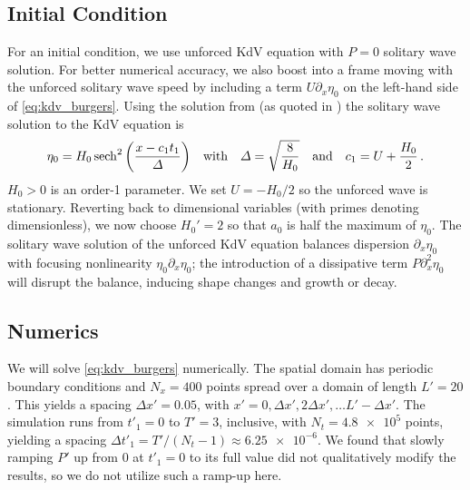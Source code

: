 \documentclass{jfm}
\begin{document}
\subsection{Initial Condition}
For an initial condition, we use unforced KdV equation with $P=0$
solitary wave solution.
For better numerical accuracy, we also boost into a frame moving with
the unforced solitary wave speed by including a term $U\partial_x
\eta_0$ on the left-hand side of \cref{eq:kdv_burgers}.
Using the solution from \citet{dingemans1997water} (as quoted in
\citealp{brun2018convective}) the solitary wave solution to the KdV
equation is
\begin{equation}
  \eta_0 = H_0 \sech^2\pqty{\frac{x - c_1 t_1}{\Delta}}
  \qq{with}
  \Delta = \sqrt{\frac{8}{H_0}}
  \qq{and}
  c_1 = U + \frac{H_0}{2} \,.
\end{equation}
$H_0>0$ is an order-1 parameter.
We set $U=-H_0/2$ so the unforced wave is stationary.
Reverting back to dimensional variables (with primes denoting
dimensionless), we now choose $H_0'=2$ so that $a_0$ is half the maximum
of $\eta_0$.
The solitary wave solution of the unforced KdV equation balances
dispersion $\partial_x \eta_0$ with focusing nonlinearity $\eta_0
\partial_x \eta_0$; the introduction of a dissipative term $P
\partial_x^2 \eta_0$ will disrupt the balance, inducing shape changes
and growth or decay.

\subsection{Numerics}
We will solve \cref{eq:kdv_burgers} numerically.
The spatial domain has periodic boundary conditions and $N_x = 400$
points spread over a domain of length $L' = 20$.
This yields a spacing $\Delta x' = 0.05$, with $x' = 0, \Delta x',
2\Delta x', \ldots L' - \Delta x'$.
The simulation runs from $t'_1 = 0$ to $T' = 3$, inclusive, with
$N_t = \num{4.8e5}$ points, yielding a spacing $\Delta t'_1 = T'/(N_t-1)
\approx \num{6.25e-6}$.
We found that slowly ramping $P'$ up from $0$ at $t'_1=0$ to its full
value did not qualitatively modify the results, so we do not utilize
such a ramp-up here.
\end{document}
